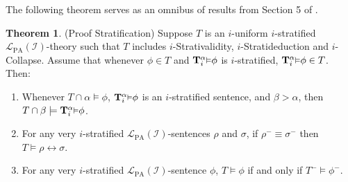 \documentclass[reqno]{article}
\theoremstyle{definition}
\newtheorem{theorem}{Theorem}
\def\L{\mathscr{L}}
\def\T{\mathbf{T}}
\def\LPA{\L_{\mathrm{PA}}}
\def\indset{\mathcal I}
\newcommand{\Prr}[2]{\T^{#1}_{#2}\mbox{\small${\vDash}$}}
\begin{document}
The following theorem serves as an omnibus of results from Section 5 of \cite{carlson2000}.

\begin{theorem}
\label{proofstratification}
(Proof Stratification)
Suppose $T$ is an $i$-uniform $i$-stratified $\LPA(\indset)$-theory
such that $T$ includes $i$-Strativalidity,
$i$-Stratideduction and $i$-Collapse.
Assume that whenever $\phi\in T$ and $\Prr\alpha i\phi$
is $i$-stratified, $\Prr\alpha i\phi\in T$.
%
%
Then:
\begin{enumerate}
\item Whenever $T\cap\alpha\models\phi$,
$\Prr\alpha i\phi$ is an $i$-stratified sentence,
and $\beta>\alpha$, then $T\cap\beta\models\Prr\alpha i\phi$.
\item For any very $i$-stratified $\LPA(\indset)$-sentences $\rho$ and 
$\sigma$, if $\rho^-\equiv\sigma^-$
then $T\models \rho\leftrightarrow\sigma$.
\item
For any very $i$-stratified $\LPA(\indset)$-sentence $\phi$,
$T\models\phi$ if and only if $T^-\models\phi^-$.
\end{enumerate}
\end{theorem}
\end{document}
